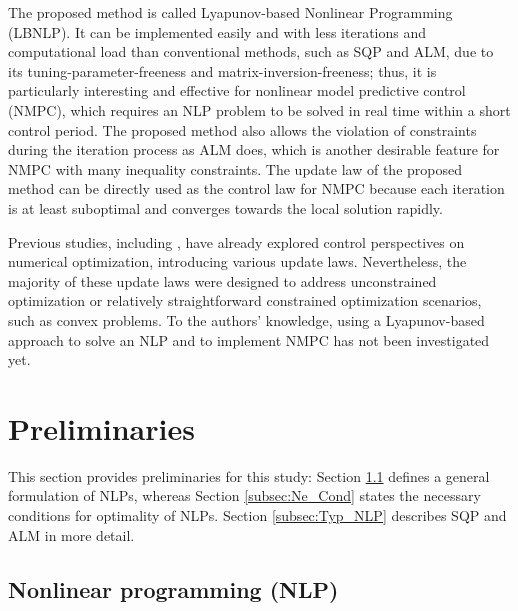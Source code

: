 \documentclass[journal]{IEEEtranTIE}
\newcommand{\CHHA}[1]{{\color{red} [CH: #1]}} %
\newcommand{\KYCH}[1]{{\color{blue} [KC: #1]}} %
\begin{document}
The proposed method is called Lyapunov-based Nonlinear Programming (LBNLP). It can be implemented easily and with less iterations and computational load than conventional methods, such as SQP and ALM, due to its tuning-parameter-freeness and matrix-inversion-freeness; thus, it is particularly interesting and effective for nonlinear model predictive control (NMPC), which requires an NLP problem to be solved in real time within a short control period. The proposed method also allows the violation of constraints during the iteration process as ALM does, which is another desirable feature for NMPC with many inequality constraints. The update law of the proposed method can be directly used as the control law for NMPC because each iteration is at least suboptimal and converges towards the local solution rapidly. 

Previous studies, including \cite{bhaya2006control}, have already explored control perspectives on numerical optimization, introducing various update laws. Nevertheless, the majority of these update laws were designed to address unconstrained optimization or relatively straightforward constrained optimization scenarios, such as convex problems. To the authors' knowledge, using a Lyapunov-based approach to solve an NLP and to implement NMPC has not been investigated yet. %



\section{Preliminaries}
\label{sec:Preliminaries}
This section provides preliminaries for this study: Section \ref{subsec:NLP} defines a general formulation of NLPs, whereas Section \ref{subsec:Ne_Cond} states the necessary conditions for optimality of NLPs. Section \ref{subsec:Typ_NLP} describes SQP and ALM in more detail.

\subsection{Nonlinear programming (NLP)}\label{subsec:NLP}
\end{document}
